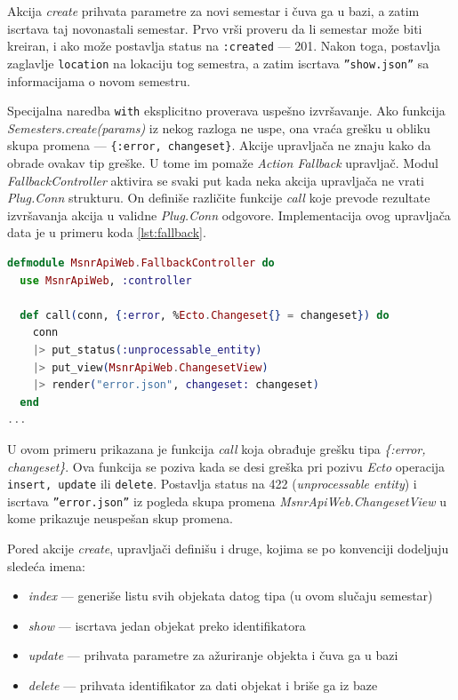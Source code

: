 \documentclass[12pt,oneside]{memoir}
\begin{document}
\par Akcija \emph{create} prihvata parametre za novi semestar i čuva ga u bazi, a zatim iscrtava taj novonastali semestar. Prvo vrši proveru da li semestar može biti kreiran, i ako može postavlja status na \texttt{:created} --- 201. Nakon toga, postavlja zaglavlje \texttt{location} na lokaciju tog semestra, a zatim iscrtava \texttt{''show.json''} sa informacijama o novom semestru.
\par Specijalna naredba \texttt{with} eksplicitno proverava uspešno izvršavanje. Ako funkcija \emph{Semesters.create(params)} iz nekog razloga ne uspe, ona vraća grešku u obliku skupa promena --- \texttt{\{:error, changeset\}}.  Akcije upravljača ne znaju kako da obrade ovakav tip greške. U tome im pomaže \emph{Action Fallback} upravljač. Modul \emph{FallbackController} aktivira se svaki put kada neka akcija upravljača ne vrati \emph{Plug.Conn} strukturu. On definiše različite funkcije \emph{call} koje prevode rezultate izvršavanja akcija u validne \emph{Plug.Conn} odgovore. Implementacija ovog upravljača data je u primeru koda \ref{lst:fallback}. \\

\begin{minipage}{\linewidth}
\begin{lstlisting}[language=elixir, basicstyle=\small, caption={Struktura upravljača \emph{FallbackController}},captionpos=b, label={lst:fallback}]
defmodule MsnrApiWeb.FallbackController do
  use MsnrApiWeb, :controller

  def call(conn, {:error, %Ecto.Changeset{} = changeset}) do
    conn
    |> put_status(:unprocessable_entity)
    |> put_view(MsnrApiWeb.ChangesetView)
    |> render("error.json", changeset: changeset)
  end
...
\end{lstlisting}
\end{minipage}


\par U ovom primeru prikazana je funkcija \emph{call} koja obrađuje grešku tipa \emph{\{:error, changeset\}}. Ova funkcija se poziva kada se desi greška pri pozivu \emph{Ecto}     operacija \texttt{insert, update} ili \texttt{delete}. Postavlja status na 422 (\emph{unprocessable entity}) i iscrtava \texttt{''error.json''} iz pogleda skupa promena \emph{MsnrApiWeb.ChangesetView} u kome prikazuje neuspešan skup promena.


\par Pored akcije \emph{create}, upravljači definišu i druge, kojima se po konvenciji dodeljuju sledeća imena: 
\begin{itemize}
\item \emph{index} --- generiše listu svih objekata datog tipa (u ovom slučaju semestar)
\item \emph{show} --- iscrtava jedan objekat preko identifikatora
\item \emph{update} --- prihvata parametre za ažuriranje objekta i čuva ga u bazi
\item \emph{delete} --- prihvata identifikator za dati objekat i briše ga iz baze
\end{itemize}
\end{document}
